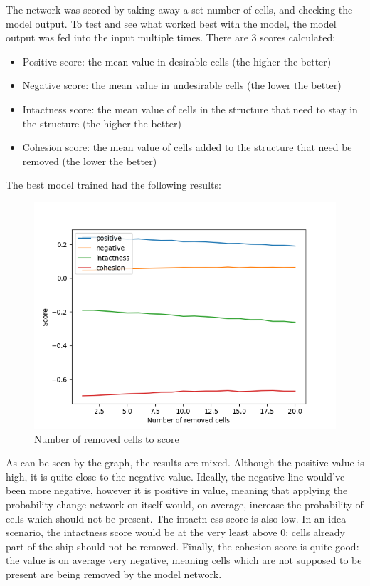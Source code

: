 \documentclass{l4proj}
\begin{document}
The network was scored by taking away a set number of cells, and checking the model output. To test and see what worked best with the model, the model output was fed into the input multiple times. There are 3 scores calculated:

\begin{itemize}
    \item Positive score: the mean value in desirable cells (the higher the better)
    \item Negative score: the mean value in undesirable cells (the lower the better)
    \item Intactness score: the mean value of cells in the structure that need to stay in the structure (the higher the better)
    \item Cohesion score: the mean value of cells added to the structure that need be removed (the lower the better)
\end{itemize}

The best model trained had the following results:

\begin{figure}[h]
\centering
\includegraphics[width=0.6\linewidth]{dissertation/images/graphs/n_removed_cells_score_probability_analysis.png}
\caption{Number of removed cells to score}
\label{fig:subim1}
\end{figure}

As can be seen by the graph, the results are mixed. Although the positive value is high, it is quite close to the negative value. Ideally, the negative line would've been more negative, however it is positive in value, meaning that applying the probability change network on itself would, on average, increase the probability of cells which should not be present. The intactn ess score is also low. In an idea scenario, the intactness score would be at the very least above 0: cells already part of the ship should not be removed. Finally, the cohesion score is quite good: the value is on average very negative, meaning cells which are not supposed to be present are being removed by the model network.
\end{document}

